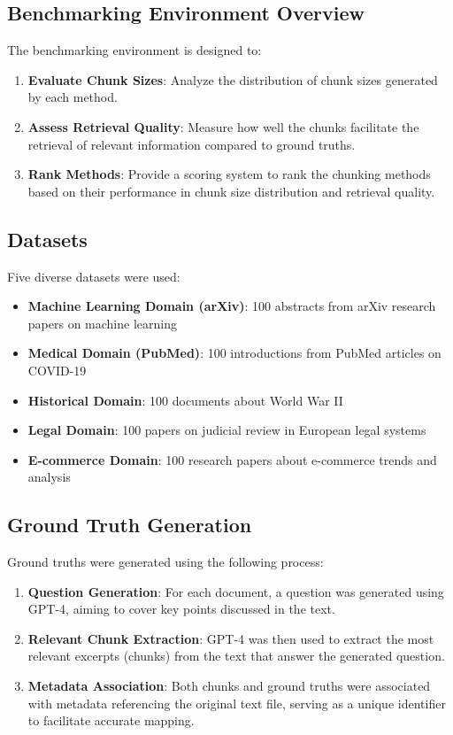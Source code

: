 \documentclass[12pt]{article}
\begin{document}
\subsection{Benchmarking Environment Overview}
The benchmarking environment is designed to:
\begin{enumerate}
    \item \textbf{Evaluate Chunk Sizes}: Analyze the distribution of chunk sizes generated by each method.
    \item \textbf{Assess Retrieval Quality}: Measure how well the chunks facilitate the retrieval of relevant information compared to ground truths.
    \item \textbf{Rank Methods}: Provide a scoring system to rank the chunking methods based on their performance in chunk size distribution and retrieval quality.
\end{enumerate}

\subsection{Datasets}
Five diverse datasets were used:
\begin{itemize}
    \item \textbf{Machine Learning Domain (arXiv)}: 100 abstracts from arXiv research papers on machine learning
    \item \textbf{Medical Domain (PubMed)}: 100 introductions from PubMed articles on COVID-19
    \item \textbf{Historical Domain}: 100 documents about World War II
    \item \textbf{Legal Domain}: 100 papers on judicial review in European legal systems
    \item \textbf{E-commerce Domain}: 100 research papers about e-commerce trends and analysis
\end{itemize}

\subsection{Ground Truth Generation}
Ground truths were generated using the following process:
\begin{enumerate}
    \item \textbf{Question Generation}: For each document, a question was generated using GPT-4, aiming to cover key points discussed in the text.
    \item \textbf{Relevant Chunk Extraction}: GPT-4 was then used to extract the most relevant excerpts (chunks) from the text that answer the generated question.
    \item \textbf{Metadata Association}: Both chunks and ground truths were associated with metadata referencing the original text file, serving as a unique identifier to facilitate accurate mapping.
\end{enumerate}
\end{document}
